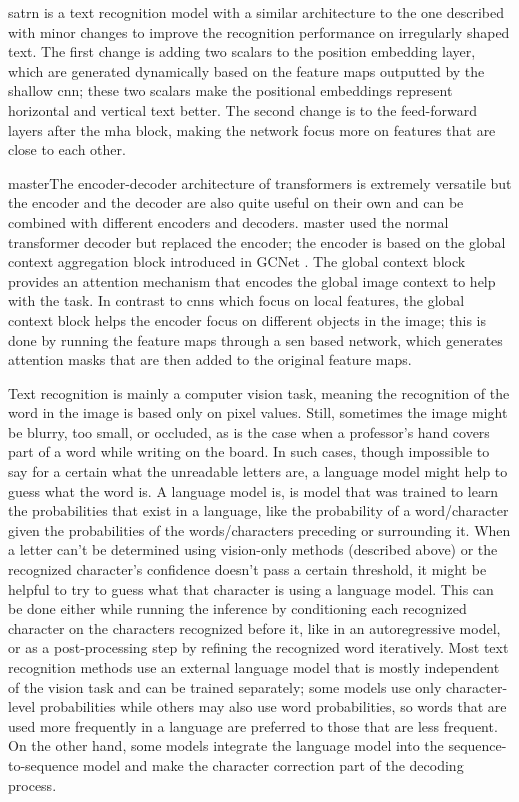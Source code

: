 \label{satrn}\gls{satrn} \cite{lee_recognizing_2020} is a text recognition model with a similar architecture to the one described with minor changes to improve the recognition performance on irregularly shaped text. The first change is adding two scalars to the position embedding layer, which are generated dynamically based on the feature maps outputted by the shallow \gls{cnn}; these two scalars make the positional embeddings represent horizontal and vertical text better. The second change is to the feed-forward layers after the \gls{mha} block, making the network focus more on features that are close to each other.

\label{master}\gls{master}The encoder-decoder architecture of transformers is extremely versatile but the encoder and the decoder are also quite useful on their own and can be combined with different encoders and decoders. \gls{master} \cite{lu_master_2021} used the normal transformer decoder but replaced the encoder; the encoder is based on the global context aggregation block introduced in GCNet \cite{cao_gcnet_2019}. The global context block provides an attention mechanism that encodes the global image context to help with the task. In contrast to \gls{cnn}s which focus on local features, the global context block helps the encoder focus on different objects in the image; this is done by running the feature maps through a \gls{sen} based network, which generates attention masks that are then added to the original feature maps.

Text recognition is mainly a computer vision task, meaning the recognition of the word in the image is based only on pixel values. Still, sometimes the image might be blurry, too small, or occluded, as is the case when a professor's hand covers part of a word while writing on the board. In such cases, though impossible to say for a certain what the unreadable letters are, a language model might help to guess what the word is. A language model is, is model that was trained to learn the probabilities that exist in a language, like the probability of a word/character given the probabilities of the words/characters preceding or surrounding it. When a letter can't be determined using vision-only methods (described above) or the recognized character's confidence doesn't pass a certain threshold, it might be helpful to try to guess what that character is using a language model. This can be done either while running the inference by conditioning each recognized character on the characters recognized before it, like in an autoregressive model, or as a post-processing step by refining the recognized word iteratively. Most text recognition methods use an external language model that is mostly independent of the vision task and can be trained separately; some models use only character-level probabilities while others may also use word probabilities, so words that are used more frequently in a language are preferred to those that are less frequent. On the other hand, some models integrate the language model into the sequence-to-sequence model and make the character correction part of the decoding process.

